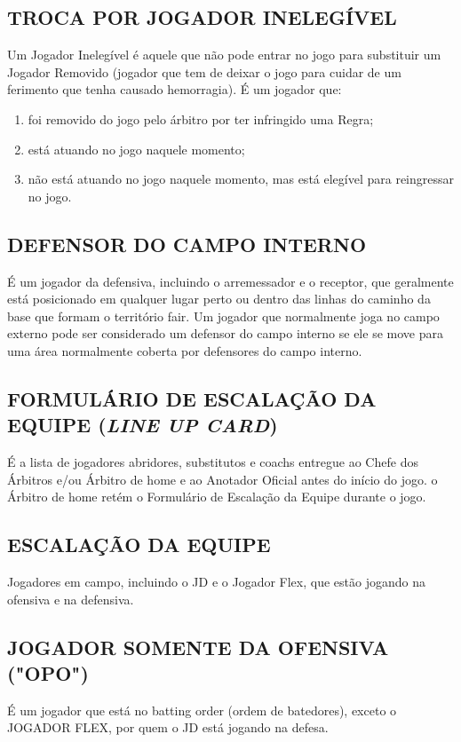 \subsection{TROCA POR JOGADOR INELEGÍVEL}
Um Jogador Inelegível é aquele que não pode entrar no jogo para substituir um Jogador Removido (jogador que tem de deixar o jogo para cuidar de um ferimento que tenha causado hemorragia). É um jogador que:

\begin{enumerate}[label=(\alph*)]\item   foi removido do jogo pelo árbitro por ter infringido uma Regra;
	\item  está atuando no jogo naquele momento;
	\item  não está atuando no jogo naquele momento, mas está elegível para reingressar no jogo.
\end{enumerate}

\subsection{DEFENSOR DO CAMPO INTERNO}

É um jogador da defensiva, incluindo o arremessador e o receptor, que geralmente está posicionado em qualquer lugar perto ou dentro das linhas do caminho da base que formam o território \gls{fair}. Um jogador que normalmente joga no campo externo pode ser considerado um defensor do campo interno se ele se move para uma área normalmente coberta por defensores do campo interno.

\subsection{FORMULÁRIO DE ESCALAÇÃO DA EQUIPE (\textit{LINE UP CARD})}
É a lista de jogadores abridores, substitutos e \glspl{coach} entregue ao Chefe dos Árbitros e/ou Árbitro de \gls{home} e ao Anotador Oficial antes do início do jogo. o Árbitro de \gls{home} retém o Formulário de Escalação da Equipe durante o jogo.

\subsection{ESCALAÇÃO DA EQUIPE}
Jogadores em campo, incluindo o JD e o Jogador Flex, que estão jogando na ofensiva e na defensiva.

\subsection{JOGADOR SOMENTE DA OFENSIVA ("OPO")}
É um jogador que está no \gls{batting order} (ordem de batedores), exceto o JOGADOR FLEX, por quem o JD está jogando na defesa.
